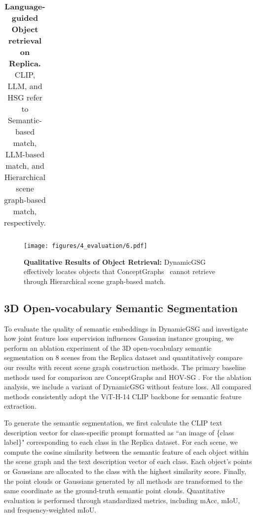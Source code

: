 \begin{table}[!t]
\begin{tabular}{llccccc}
    \bottomrule
\end{tabular}

    \caption{\textbf{Language-guided Object retrieval on Replica\cite{replica19arxiv}.} CLIP, LLM, and HSG refer to Semantic-based match, LLM-based match, and Hierarchical scene graph-based match, respectively.}
    \label{tab:objret}
        \vspace{-1em}
\end{table}

\begin{figure}[tb]
  \centering
  \texttt{[image: figures/4\_evaluation/6.pdf]}
  \caption{\textbf{Qualitative Results of Object Retrieval:} DynamicGSG effectively locates objects that ConceptGraphs~\cite{gu2023conceptgraphsopenvocabulary3dscene} cannot retrieve through Hierarchical scene graph-based match.}
  \label{fig:obj_retrieval}
  \vspace{-1em}
\end{figure}


\subsection{3D Open-vocabulary Semantic Segmentation}
\label{subsec:semantic_segmentation}
To evaluate the quality of semantic embeddings in DynamicGSG and investigate how joint feature loss supervision influences Gaussian instance grouping, we perform an ablation experiment of the 3D open-vocabulary semantic segmentation on 8 scenes from the Replica dataset \cite{replica19arxiv} and quantitatively compare our results with recent scene graph construction methods. The primary baseline methods used for comparison are ConceptGraphs \cite{gu2023conceptgraphsopenvocabulary3dscene} and HOV-SG \cite{werby23hovsg}. For the ablation analysis, we include a variant of DynamicGSG without feature loss. All compared methods consistently adopt the ViT-H-14 CLIP backbone for semantic feature extraction.

To generate the semantic segmentation, we first calculate the CLIP text description vector for class-specific prompt formatted as ``an image of \{class label\}" corresponding to each class in the Replica dataset. For each scene, we compute the cosine similarity between the semantic feature of each object within the scene graph and the text description vector of each class. Each object's points or Gaussians are allocated to the class with the highest similarity score. Finally, the point clouds or Gaussians generated by all methods are transformed to the same coordinate as the ground-truth semantic point clouds. Quantitative evaluation is performed through standardized metrics, including mAcc, mIoU, and frequency-weighted mIoU. 

